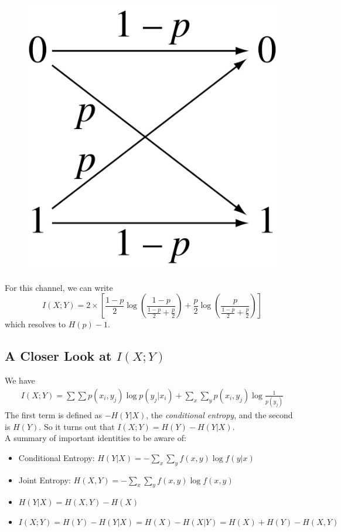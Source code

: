 \documentclass[11pt]{article}
\theoremstyle{definition}
\begin{document}
\begin{figure}[ht]
\centering
\includegraphics[scale=0.1]{binarysymmetric}
\end{figure}

For this channel, we can write
$$ 
I(X; Y) = 2 \times \left[ \frac{1-p}{2} \log \left( \frac{1-p}{\frac{1-p}{2} + \frac{p}{2}} \right) + 
	      \frac{p}{2} \log \left( \frac{p}{\frac{1-p}{2} + \frac{p}{2}} \right) \right]
$$
which resolves to $H(p) - 1$.

\subsection{A Closer Look at $I(X;Y)$}

We have 
\begin{align*}
I(X;Y) = \sum \sum p(x_i, y_j) \log p(y_j | x_i) + \sum_x \sum_y p(x_i, y_j) \log \frac{1}{p(y_j)}
\end{align*}
The first term is defined as $-H(Y|X)$, the \textit{conditional entropy}, and the second is $H(Y)$. So it turns out that $I(X;Y) = H(Y) - H(Y|X)$. \\

\noindent A summary of important identities to be aware of:
\begin{itemize}
\item Conditional Entropy: $H(Y|X) = -\sum_x \sum_y f(x, y) \log f(y|x)$
\item Joint Entropy: $H(X, Y) = -\sum_x \sum_y f(x, y) \log f(x, y)$
\item $H(Y|X) = H(X, Y) - H(X)$
\item $I(X; Y) = H(Y) - H(Y|X) = H(X) - H(X|Y) = H(X) + H(Y) - H(X, Y)$
\end{itemize}
\end{document}
